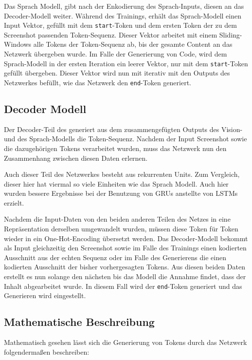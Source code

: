 \documentclass[pdftex,a4paper,halfparskip, article]{scrartcl}
\begin{document}
Das Sprach Modell, gibt nach der Enkodierung des Sprach-Inputs, diesen an das Decoder-Modell weiter. Während des Trainings, erhält das Sprach-Modell einen Input Vektor, gefüllt mit dem \texttt{start}-Token und dem ersten Token der zu dem Screenshot passenden Token-Sequenz. Dieser Vektor arbeitet mit einem Sliding-Windows alle Tokens der Token-Sequenz ab, bis der gesamte Content an das Netzwerk übergeben wurde. Im Falle der Generierung von Code, wird dem Sprach-Modell in der ersten Iteration ein leerer Vektor, nur mit dem \texttt{start}-Token gefüllt übergeben. Dieser Vektor wird nun mit iterativ mit den Outputs des Netzwerkes befüllt, wie das Netzwerk den \texttt{end}-Token generiert.


\subsection{Decoder Modell}



Der Decoder-Teil des generiert aus dem zusammengefügten Outputs des Vision- und des Sprach-Modells die Token-Sequenz. Nachdem der Input Screenshot sowie die dazugehörigen Tokens verarbeitet wurden, muss das Netzwerk nun den Zusammenhang zwischen diesen Daten erlernen. 

Auch dieser Teil des Netzwerkes besteht aus rekurrenten Units. Zum Vergleich, dieser hier hat viermal so viele Einheiten wie das Sprach Modell. Auch hier wurden bessere Ergebnisse bei der Benutzung von GRUs anstellte von LSTMs erzielt.

Nachdem die Input-Daten von den beiden anderen Teilen des Netzes in eine Repräsentation derselben umgewandelt wurden, müssen diese Token für Token wieder in ein One-Hot-Encoding übersetzt werden. Das Decoder-Modell bekommt als Input gleichzeitig den Screenshot sowie im Falle des Trainings einen kodierten Ausschnitt aus der echten Sequenz oder im Falle des Generierens die einen kodierten Ausschnitt der bisher vorhergesagten Tokens. Aus diesen beiden Daten erstellt es nun solange den nächsten bis das Modell die Annahme findet, dass der Inhalt abgearbeitet wurde. In diesem Fall wird der \texttt{end}-Token generiert und das Generieren wird eingestellt.


\subsection{Mathematische Beschreibung}

Mathematisch gesehen lässt sich die Generierung von Tokens durch das Netzwerk folgendermaßen beschreiben:
\end{document}
